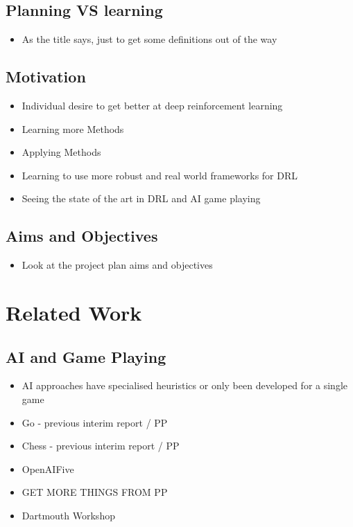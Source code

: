 \documentclass[a4paper]{article}
\begin{document}
\subsection{Planning VS learning}
\begin{itemize}
    \item As the title says, just to get some definitions out of the way
\end{itemize}
\subsection{Motivation}
\begin{itemize}
    \item Individual desire to get better at deep reinforcement learning
    \item Learning more Methods
    \item Applying Methods
    \item Learning to use more robust and real world frameworks for DRL \\
    \item Seeing the state of the art in DRL and AI game playing
\end{itemize}
\subsection{Aims and Objectives}
\begin{itemize}
    \item Look at the project plan aims and objectives
\end{itemize}

\section{Related Work}
\subsection{AI and Game Playing}
\begin{itemize}
    \item AI approaches have specialised heuristics or only been developed for a single game
    \\
    \item Go - previous interim report / PP
    \item Chess - previous interim report / PP
    \item OpenAIFive
    \item GET MORE THINGS FROM PP
    \\
    \item Dartmouth Workshop
\end{itemize}
\end{document}
